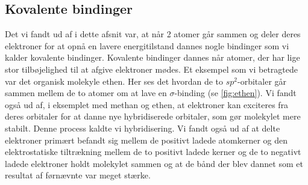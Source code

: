 \subsection{Kovalente bindinger}
Det vi fandt ud af i dette afsnit var, at når 2 atomer går sammen og deler deres elektroner for at opnå en lavere energitilstand dannes nogle bindinger som vi kalder kovalente bindinger. Kovalente bindinger dannes når atomer, der har lige stor tilbøjelighed til at afgive elektroner mødes. Et eksempel som vi betragtede var det organisk molekyle ethen. Her ses det hvordan de to $sp^2$-orbitaler går sammen mellem de to atomer om at lave en $\sigma$-binding (se \ref{fig:ethen}). Vi fandt også ud af, i eksemplet med methan og ethen, at elektroner kan exciteres fra deres orbitaler for at danne nye hybridiserede orbitaler, som gør molekylet mere stabilt. Denne process kaldte vi hybridisering. Vi fandt også ud af at delte elektroner primært befandt sig mellem de positivt ladede atomkerner og den elektrostatiske tiltrækning mellem de to positivt ladede kerner og de to negativt ladede elektroner holdt molekylet sammen og at de bånd der blev dannet som et resultat af førnævnte var meget stærke.

